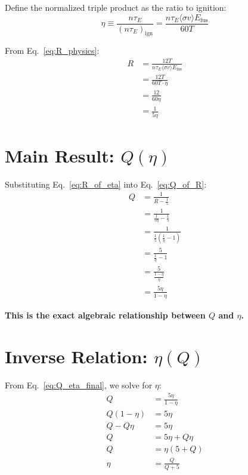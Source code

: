 \documentclass[11pt,a4paper]{article}
\begin{document}
Define the normalized triple product as the ratio to ignition:
\begin{equation}
\eta \equiv \frac{n \tau_E}{(n \tau_E)_{\text{ign}}} = \frac{n \tau_E \langle\sigma v\rangle E_{\text{fus}}}{60T}
\label{eq:eta_def}
\end{equation}

From Eq.~\eqref{eq:R_physics}:
\begin{align}
R &= \frac{12T}{n \tau_E \langle\sigma v\rangle E_{\text{fus}}} \nonumber \\
  &= \frac{12T}{60T \cdot \eta} \nonumber \\
  &= \frac{12}{60\eta} \nonumber \\
  &= \frac{1}{5\eta}
\label{eq:R_of_eta}
\end{align}

\section{Main Result: $Q(\eta)$}

Substituting Eq.~\eqref{eq:R_of_eta} into Eq.~\eqref{eq:Q_of_R}:
\begin{align}
Q &= \frac{1}{R - \frac{1}{5}} \nonumber \\
  &= \frac{1}{\frac{1}{5\eta} - \frac{1}{5}} \nonumber \\
  &= \frac{1}{\frac{1}{5}\left(\frac{1}{\eta} - 1\right)} \nonumber \\
  &= \frac{5}{\frac{1}{\eta} - 1} \nonumber \\
  &= \frac{5}{\frac{1 - \eta}{\eta}} \nonumber \\
  &= \boxed{\frac{5\eta}{1 - \eta}}
\label{eq:Q_eta_final}
\end{align}

\textbf{This is the exact algebraic relationship between $Q$ and $\eta$.}

\section{Inverse Relation: $\eta(Q)$}

From Eq.~\eqref{eq:Q_eta_final}, we solve for $\eta$:
\begin{align}
Q &= \frac{5\eta}{1 - \eta} \nonumber \\
Q(1 - \eta) &= 5\eta \nonumber \\
Q - Q\eta &= 5\eta \nonumber \\
Q &= 5\eta + Q\eta \nonumber \\
Q &= \eta(5 + Q) \nonumber \\
\eta &= \boxed{\frac{Q}{Q + 5}}
\label{eq:eta_of_Q}
\end{align}
\end{document}
